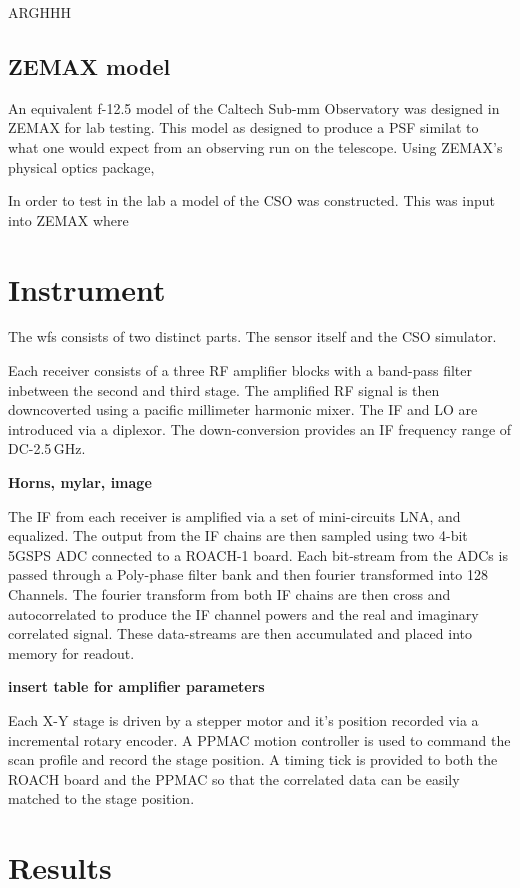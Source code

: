 \documentclass[osajnl,twocolumn,showpacs,superscriptaddress,11pt]{revtex4-1} %
\begin{document}
ARGHHH

\subsection{ZEMAX model}

An equivalent f-12.5 model of the Caltech Sub-mm Observatory was designed in ZEMAX for lab testing.  This model as designed to produce a PSF similat to what one would expect from an observing run on the telescope.  Using ZEMAX's physical optics package, 

In order to test in the lab a model of the CSO was constructed. This was input into ZEMAX where 
\section{Instrument}

The wfs consists of two distinct parts. The sensor itself and the CSO simulator.

Each receiver consists of a three RF amplifier blocks with a band-pass filter inbetween the second and third stage. The amplified RF signal is then downcoverted using a pacific millimeter harmonic mixer. The IF and LO are introduced via a diplexor.  The down-conversion provides an IF frequency range of DC-2.5\,GHz.

{\bf Horns, mylar, image}

The IF from each receiver is amplified via a set of mini-circuits LNA, and equalized.  The output from the IF chains are then sampled using two 4-bit 5GSPS ADC connected to a ROACH-1 board.  Each bit-stream from the ADCs is passed through a Poly-phase filter bank and then fourier transformed into 128 Channels.  The fourier transform from both IF chains are then cross and autocorrelated to produce the IF channel powers and the real and imaginary correlated signal.    These data-streams are then accumulated and placed into memory for readout.  

{\bf insert table for amplifier parameters}

Each X-Y stage is driven by a stepper motor and it's position recorded via a incremental rotary encoder.  A PPMAC motion controller is used to command the scan profile and record the stage position.  A timing tick is provided to both the ROACH board and the PPMAC so that the correlated data can be easily matched to the stage position.

\section{Results}
\end{document}
